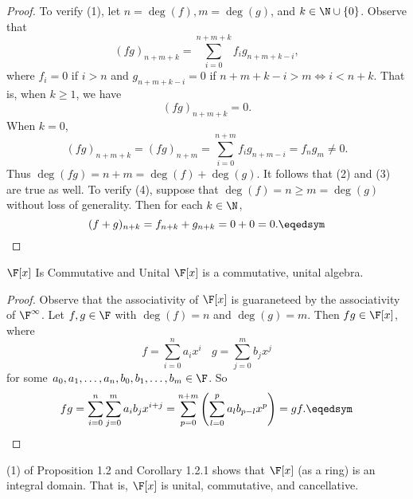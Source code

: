 \documentclass[linearalgebraII]{subfiles}
\begin{document}
    \begin{proof}
        To verify (1), let $n=\deg(f), m=\deg(g)$, and $k\in \N\cup \left\lbrace 0 \right\rbrace$. Observe that
        \begin{equation*}
            (fg)_{n+m+k} = \sum^{n+m+k}_{i=0} f_ig_{n+m+k-i},
        \end{equation*}
        where $f_i=0$ if $i>n$ and $g_{n+m+k-i}=0$ if $n+m+k-i>m\iff i<n+k$. That is, when $k\geq 1$, we have
        \begin{equation*}
            (fg)_{n+m+k} = 0.
        \end{equation*}
        When $k=0$,
        \begin{equation*}
            (fg)_{n+m+k} = (fg)_{n+m} = \sum^{n+m}_{i=0} f_ig_{n+m-i} = f_ng_m \neq 0.
        \end{equation*}
        Thus $\deg(fg) = n+m = \deg(f) + \deg(g)$. It follows that (2) and (3) are true as well. To verify (4), suppose that $\deg(f) = n \geq m = \deg(g)$ without loss of generality. Then for each $k\in \N$,
        \begin{equation*}
            (f+g)_{n+k} = f_{n+k} + g_{n+k} = 0 + 0 = 0. \eqedsym
        \end{equation*}
    \end{proof}

    \begin{cor}{$\F[x]$ Is Commutative and Unital}
        $\F[x]$ is a commutative, unital algebra.
    \end{cor}	

    \begin{proof}
        Observe that the associativity of $\F[x]$ is guaraneteed by the associativity of $\F^\infty$. Let $f,g\in \F$ with $\deg(f) = n$ and $\deg(g) = m$. Then $fg\in \F[x]$, where
        \begin{equation*}
            f = \sum^n_{i=0} a_ix^i \ \ \ \ g = \sum^m_{j=0} b_jx^j 
        \end{equation*}
        for some $a_0, a_1, \ldots, a_n, b_0, b_1, \ldots, b_m\in \F$. So
        \begin{equation*}
            fg = \sum^n_{i=0}\sum^m_{j=0} a_ib_jx^{i+j} = \sum^{n+m}_{p=0} \left( \sum^p_{l=0} a_lb_{p-l}x^p \right) = gf. \eqedsym
        \end{equation*}
    \end{proof}

    \begin{remark}
        (1) of Proposition 1.2 and Corollary 1.2.1 shows that $\F[x]$ (as a ring) is an integral domain. That is, $\F[x]$ is unital, commutative, and cancellative.
    \end{remark}
\end{document}
